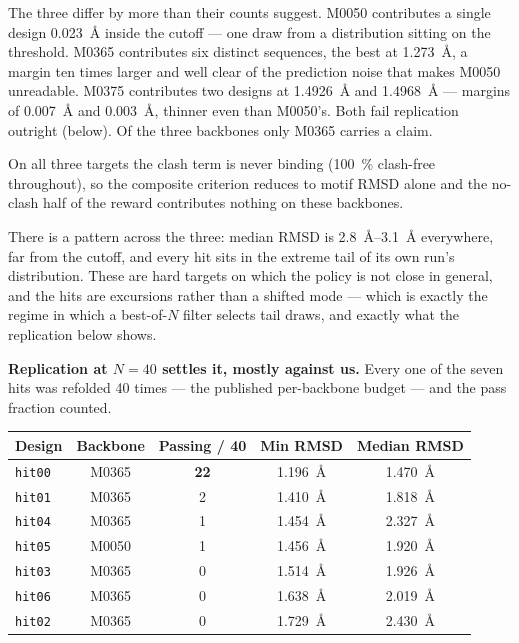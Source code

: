 The three differ by more than their counts suggest. M0050 contributes a single
design \SI{0.023}{\angstrom} inside the cutoff --- one draw from a distribution
sitting on the threshold. M0365 contributes six distinct sequences, the best at
\SI{1.273}{\angstrom}, a margin ten times larger and well clear of the
prediction noise that makes M0050 unreadable. M0375 contributes two designs at \SI{1.4926}{\angstrom} and
\SI{1.4968}{\angstrom} --- margins of \SI{0.007}{\angstrom} and
\SI{0.003}{\angstrom}, thinner even than M0050's. Both fail replication outright
(below). Of the three backbones only M0365 carries a claim.

On all three targets the clash term is never binding (\SI{100}{\percent}
clash-free throughout), so the composite criterion reduces to motif RMSD alone
and the no-clash half of the reward contributes nothing on these backbones.

There is a pattern across the three: median RMSD is \SIrange{2.8}{3.1}{\angstrom}
everywhere, far from the cutoff, and every hit sits in the extreme tail of its
own run's distribution. These are hard targets on which the policy is not
close in general, and the hits are excursions rather than a shifted mode ---
which is exactly the regime in which a best-of-$N$ filter selects tail draws,
and exactly what the replication below shows.

\textbf{Replication at $N = 40$ settles it, mostly against us.} Every one of the
seven hits was refolded 40 times --- the published per-backbone budget --- and
the pass fraction counted.

\begin{center}
\begin{tabular}{@{}lcccc@{}}
\toprule
\textbf{Design} & \textbf{Backbone} & \textbf{Passing / 40} &
\textbf{Min RMSD} & \textbf{Median RMSD} \\
\midrule
\texttt{hit00} & M0365 & \textbf{22} & \SI{1.196}{\angstrom} & \SI{1.470}{\angstrom} \\
\texttt{hit01} & M0365 & 2  & \SI{1.410}{\angstrom} & \SI{1.818}{\angstrom} \\
\texttt{hit04} & M0365 & 1  & \SI{1.454}{\angstrom} & \SI{2.327}{\angstrom} \\
\texttt{hit05} & M0050 & 1  & \SI{1.456}{\angstrom} & \SI{1.920}{\angstrom} \\
\texttt{hit03} & M0365 & 0  & \SI{1.514}{\angstrom} & \SI{1.926}{\angstrom} \\
\texttt{hit06} & M0365 & 0  & \SI{1.638}{\angstrom} & \SI{2.019}{\angstrom} \\
\texttt{hit02} & M0365 & 0  & \SI{1.729}{\angstrom} & \SI{2.430}{\angstrom} \\
\bottomrule
\end{tabular}
\end{center}

